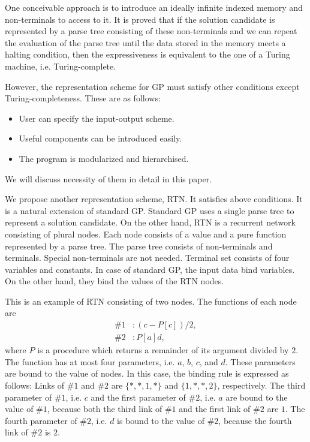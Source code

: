 \documentclass[9pt]{jsarticle}
\begin{document}
One conceivable approach is to introduce an ideally infinite indexed memory and non-terminals to access to it. It is proved that if the solution candidate is represented by a parse tree consisting of these non-terminals and we can repeat the evaluation of the parse tree until the data stored in the memory meets a halting condition, then the expressiveness is equivalent to the one of a Turing machine, i.e. Turing-complete.

However, the representation scheme for GP must satisfy other conditions except Turing-completeness. These are as follows:
\begin{itemize}
  \item User can specify the input-output scheme.
  \item Useful components can be introduced easily.
  \item The program is modularized and hierarchised.
\end{itemize}	
We will discuss necessity of them in detail in this paper.

We propose another representation scheme, RTN. It satisfies above conditions. It is a natural extension of standard GP. Standard GP uses a single parse tree to represent a solution candidate. On the other hand, RTN is a recurrent network consisting of plural nodes. Each node consists of a value and a pure function represented by a parse tree. The parse tree consists of non-terminals and terminals. Special non-terminals are not needed. Terminal set consists of four variables and constants. In case of standard GP, the input data bind variables. On the other hand, they bind the values of the RTN nodes.

This is an example of RTN consisting of two nodes. The functions of each node are
\begin{align*}
\#1&: (c-P[c])/2,\\
\#2&: P[a] d,
\end{align*}
where $P$ is a procedure which returns a remainder of its argument divided by $2$. The function has at most four parameters, i.e. $a$, $b$, $c$, and $d$. These parameters are bound to the value of nodes. In this case, the binding rule is expressed as follows: Links of $\#1$ and $\#2$ are $\{*, *, 1, *\}$ and $\{1, *, *, 2\}$, respectively. The third parameter of $\#1$, i.e. $c$ and the first parameter of $\#2$, i.e. $a$ are bound to the value of $\#1$, because both the third link of $\#1$ and the first link of $\#2$ are $1$. The fourth parameter of $\#2$, i.e. $d$ is bound to the value of $\#2$, because the fourth link of $\#2$ is $2$.
\end{document}
